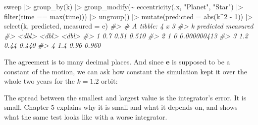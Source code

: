 \documentclass[
  10.5pt,
  letterpaper,
]{scrbook}
\newenvironment{Shaded}{\begin{snugshade}}{\end{snugshade}}
\newcommand{\AttributeTok}[1]{\textcolor[rgb]{0.00,0.00,0.00}{#1}}
\newcommand{\CommentTok}[1]{\textcolor[rgb]{0.00,0.00,0.00}{\textit{#1}}}
\newcommand{\DecValTok}[1]{\textcolor[rgb]{0.00,0.00,0.00}{#1}}
\newcommand{\FloatTok}[1]{\textcolor[rgb]{0.00,0.00,0.00}{#1}}
\newcommand{\FunctionTok}[1]{\textcolor[rgb]{0.00,0.00,0.00}{#1}}
\newcommand{\NormalTok}[1]{\textcolor[rgb]{0.00,0.00,0.00}{#1}}
\newcommand{\OtherTok}[1]{\textcolor[rgb]{0.00,0.00,0.00}{#1}}
\newcommand{\SpecialCharTok}[1]{\textcolor[rgb]{0.00,0.00,0.00}{#1}}
\newcommand{\StringTok}[1]{\textcolor[rgb]{0.00,0.00,0.00}{#1}}
\theoremstyle{definition}
\theoremstyle{plain}
\theoremstyle{remark}
\begin{document}
\begin{Shaded}
\begin{Highlighting}[]
\NormalTok{sweep }\SpecialCharTok{|\textgreater{}}
  \FunctionTok{group\_by}\NormalTok{(k) }\SpecialCharTok{|\textgreater{}}
  \FunctionTok{group\_modify}\NormalTok{(}\SpecialCharTok{\textasciitilde{}} \FunctionTok{eccentricity}\NormalTok{(.x, }\StringTok{"Planet"}\NormalTok{, }\StringTok{"Star"}\NormalTok{) }\SpecialCharTok{|\textgreater{}}
                 \FunctionTok{filter}\NormalTok{(time }\SpecialCharTok{==} \FunctionTok{max}\NormalTok{(time))) }\SpecialCharTok{|\textgreater{}}
  \FunctionTok{ungroup}\NormalTok{() }\SpecialCharTok{|\textgreater{}}
  \FunctionTok{mutate}\NormalTok{(}\AttributeTok{predicted =} \FunctionTok{abs}\NormalTok{(k}\SpecialCharTok{\^{}}\DecValTok{2} \SpecialCharTok{{-}} \DecValTok{1}\NormalTok{)) }\SpecialCharTok{|\textgreater{}}
  \FunctionTok{select}\NormalTok{(k, predicted, }\AttributeTok{measured =}\NormalTok{ e)}
\CommentTok{\#\textgreater{} \# A tibble: 4 x 3}
\CommentTok{\#\textgreater{}       k predicted    measured}
\CommentTok{\#\textgreater{}   \textless{}dbl\textgreater{}     \textless{}dbl\textgreater{}       \textless{}dbl\textgreater{}}
\CommentTok{\#\textgreater{} 1   0.7      0.51 0.510      }
\CommentTok{\#\textgreater{} 2   1        0    0.000000413}
\CommentTok{\#\textgreater{} 3   1.2      0.44 0.440      }
\CommentTok{\#\textgreater{} 4   1.4      0.96 0.960}
\end{Highlighting}
\end{Shaded}

The agreement is to many decimal places. And since \(\mathbf{e}\) is
supposed to be a constant of the motion, we can ask how constant the
simulation kept it over the whole two years for the \(k = 1.2\) orbit:

\begin{Shaded}
\end{Shaded}

The spread between the smallest and largest value is the integrator's
error. It is small. Chapter 5 explains why it is small and what it
depends on, and shows what the same test looks like with a worse
integrator.
\end{document}

